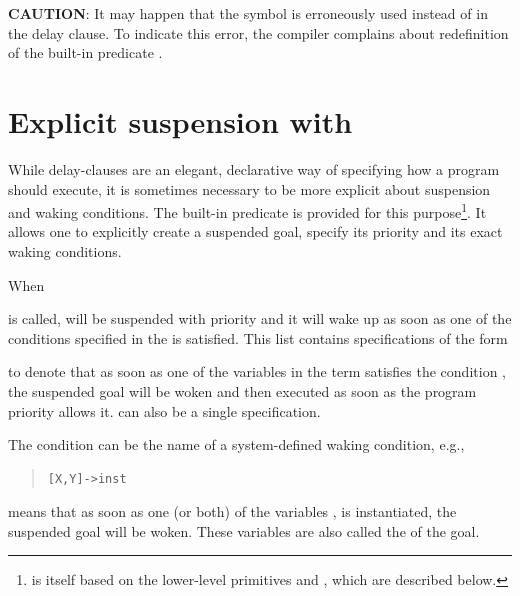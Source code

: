 \textbf{CAUTION}: It may happen that the symbol \notation{:-} is erroneously
used instead of  in the delay clause. To indicate this error,
the compiler complains about redefinition of the built-in predicate
.


\section{Explicit suspension with }
\label{suspend3}
While delay-clauses are an elegant, declarative way of specifying how
a program should execute, it is sometimes necessary to be more explicit
about suspension and waking conditions.
The built-in predicate
is provided for this purpose\footnote{
 is itself based on the lower-level primitives
and , which are described below.}.
It allows one to explicitly create a suspended goal, specify its priority
and its exact waking conditions.

When
\begin{quote}
\end{quote}
is called,  will be suspended with priority 
and it will wake up
as soon as one of the conditions specified in the 
is satisfied.
This list contains specifications of the form
\begin{quote}
\end{quote}
to denote that as soon as one of the variables in the term 
satisfies the condition , the suspended goal will
be woken and then executed as soon as the program priority allows it.
 can also be a single specification.

The condition  can be the name of a system-defined waking condition,
e.g.,
\begin{quote}
\begin{verbatim}
[X,Y]->inst
\end{verbatim}
\end{quote}
means that as soon as one (or both) of the variables , 
is instantiated, the suspended goal will be woken.
These variables are also called the  of the
goal.


